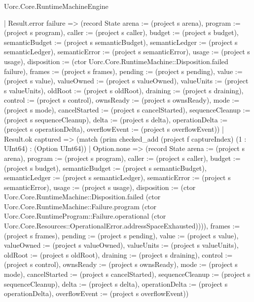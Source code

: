 \begin{lexlean}{Uorc.Core.RuntimeMachineEngine}
\begin{semanticmodule}
{          | Result.error failure => (record State {arena := (project s arena), program := (project s program), caller := (project s caller), budget := (project s budget), semanticBudget := (project s semanticBudget), semanticLedger := (project s semanticLedger), semanticError := (project s semanticError), usage := (project s usage), disposition := (ctor Uorc.Core.RuntimeMachine::Disposition.failed failure), frames := (project s frames), pending := (project s pending), value := (project s value), valueOwned := (project s valueOwned), valueUnits := (project s valueUnits), oldRoot := (project s oldRoot), draining := (project s draining), control := (project s control), ownsReady := (project s ownsReady), mode := (project s mode), cancelStarted := (project s cancelStarted), sequenceCleanup := (project s sequenceCleanup), delta := (project s delta), operationDelta := (project s operationDelta), overflowEvent := (project s overflowEvent)})
          | Result.ok captured => (match (prim checked_add (project f captureIndex) (1 : UInt64) : (Option UInt64))
            | Option.none => (record State {arena := (project s arena), program := (project s program), caller := (project s caller), budget := (project s budget), semanticBudget := (project s semanticBudget), semanticLedger := (project s semanticLedger), semanticError := (project s semanticError), usage := (project s usage), disposition := (ctor Uorc.Core.RuntimeMachine::Disposition.failed (ctor Uorc.Core.RuntimeMachine::Failure.program (ctor Uorc.Core.RuntimeProgram::Failure.operational (ctor Uorc.Core.Resources::OperationalError.addressSpaceExhausted)))), frames := (project s frames), pending := (project s pending), value := (project s value), valueOwned := (project s valueOwned), valueUnits := (project s valueUnits), oldRoot := (project s oldRoot), draining := (project s draining), control := (project s control), ownsReady := (project s ownsReady), mode := (project s mode), cancelStarted := (project s cancelStarted), sequenceCleanup := (project s sequenceCleanup), delta := (project s delta), operationDelta := (project s operationDelta), overflowEvent := (project s overflowEvent)})
}
\end{semanticmodule}
\end{lexlean}
